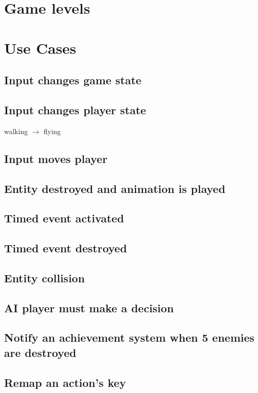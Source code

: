 \documentclass[12pt]{article}
\begin{document}
\section{	Game levels}

\section{Use Cases}
\subsection{Input changes game state}
\subsection{Input changes player state}
walking $\rightarrow$ flying
\subsection{Input moves player}
\subsection{Entity destroyed and animation is played}
\subsection{Timed event activated}
\subsection{Timed event destroyed}
\subsection{Entity collision}
\subsection{AI player must make a decision}
\subsection{Notify an achievement system when 5 enemies are destroyed}
\subsection{Remap an action's key}
\end{document}
